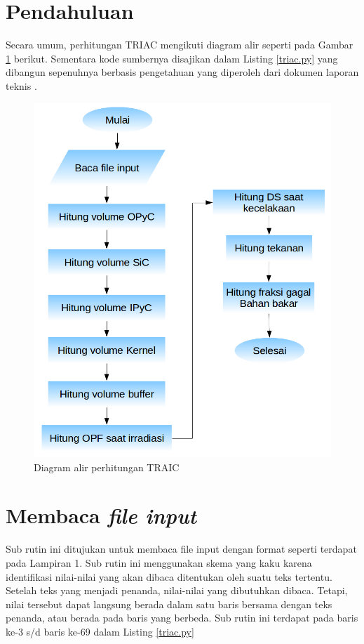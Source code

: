 \documentclass[a4paper,11pt]{report}
\begin{document}
\section{Pendahuluan}
Secara umum, perhitungan TRIAC mengikuti diagram alir seperti pada Gambar \ref{fig:flowchart} berikut. Sementara kode sumbernya disajikan dalam Listing \ref{triac.py} yang dibangun sepenuhnya berbasis pengetahuan yang diperoleh dari dokumen laporan teknis \cite{report1}.
\begin{figure}[h]
  \centering
  \includegraphics[scale=.5]{pics/Flowchart.png}
  \caption{Diagram alir perhitungan TRAIC}
  \label{fig:flowchart}
\end{figure}

\section{Membaca \textit{file input}}
Sub rutin ini ditujukan untuk membaca file input dengan format seperti terdapat pada Lampiran 1. Sub rutin ini menggunakan skema yang kaku karena identifikasi nilai-nilai yang akan dibaca ditentukan oleh suatu teks tertentu. Setelah teks yang menjadi penanda, nilai-nilai yang dibutuhkan dibaca. Tetapi, nilai tersebut dapat langsung berada dalam satu baris bersama dengan teks penanda, atau berada pada baris yang berbeda. Sub rutin ini terdapat pada baris ke-3 s/d baris ke-69 dalam Listing \ref{triac.py}
\end{document}
